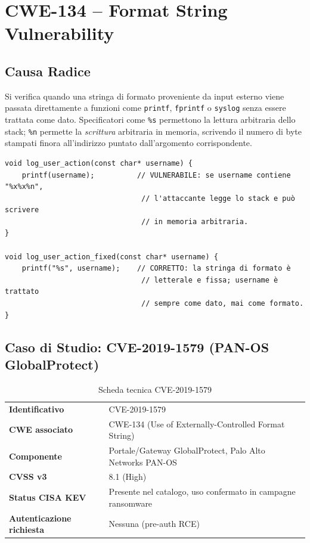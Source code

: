 \documentclass[11pt,a4paper]{article}
\begin{document}
\section{CWE-134 -- Format String Vulnerability}

\subsection{Causa Radice}

Si verifica quando una stringa di formato proveniente da input esterno viene passata direttamente a funzioni come \texttt{printf}, \texttt{fprintf} o \texttt{syslog} senza essere trattata come dato. Specificatori come \texttt{\%s} permettono la lettura arbitraria dello stack; \texttt{\%n} permette la \emph{scrittura} arbitraria in memoria, scrivendo il numero di byte stampati finora all'indirizzo puntato dall'argomento corrispondente.

\begin{lstlisting}[caption={Pattern vulnerabile (CWE-134)}]
void log_user_action(const char* username) {
    printf(username);          // VULNERABILE: se username contiene "%x%x%n",
                                // l'attaccante legge lo stack e può scrivere
                                // in memoria arbitraria.
}

void log_user_action_fixed(const char* username) {
    printf("%s", username);    // CORRETTO: la stringa di formato è
                                // letterale e fissa; username è trattato
                                // sempre come dato, mai come formato.
}
\end{lstlisting}

\subsection{Caso di Studio: CVE-2019-1579 (PAN-OS GlobalProtect)}

\begin{table}[h]
\centering
\begin{tabular}{@{}ll@{}}
\toprule
\textbf{Identificativo} & CVE-2019-1579 \\
\textbf{CWE associato} & CWE-134 (Use of Externally-Controlled Format String) \\
\textbf{Componente} & Portale/Gateway GlobalProtect, Palo Alto Networks PAN-OS \\
\textbf{CVSS v3} & 8.1 (High) \\
\textbf{Status CISA KEV} & Presente nel catalogo, uso confermato in campagne ransomware \\
\textbf{Autenticazione richiesta} & Nessuna (pre-auth RCE) \\
\bottomrule
\end{tabular}
\caption{Scheda tecnica CVE-2019-1579}
\end{table}
\end{document}
